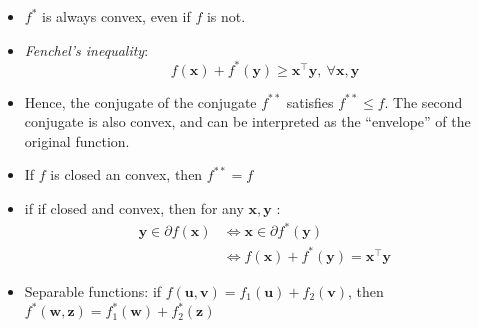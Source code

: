 \documentclass[a4paper,twoside,11pt,twocolumn]{article}
\begin{document}
\begin{itemize}
	\item $f^*$ is always convex, even if $f$ is not.
	\item \textit{Fenchel's inequality}: \[
		      f(\mathbf{x}) + f^*(\mathbf{y}) \ge \mathbf{x}^\top \mathbf{y},\ \forall \mathbf{x},\mathbf{y}
	      \]
	\item Hence, the conjugate of the conjugate $f^{**}$ satisfies $f^{**} \le f$. The second conjugate is also convex, and can be interpreted as the ``envelope'' of the original function.
	\item If $f$ is closed an convex, then $f^{**} = f$
	\item if if closed and convex, then for any $\mathbf{x},\mathbf{y}$ : \[
		      \begin{array}{ll}
			      \mathbf{y} \in \partial f(\mathbf{x}) & \Leftrightarrow \mathbf{x}\in \partial f^*(\mathbf{y})                       \\
			                                            & \Leftrightarrow f(\mathbf{x}) + f^*(\mathbf{y}) = \mathbf{x}^\top \mathbf{y}
		      \end{array}
	      \]
	\item Separable functions: if $f(\mathbf{u},\mathbf{v}) = f_1(\mathbf{u}) + f_2(\mathbf{v})$, then $f^*(\mathbf{w},\mathbf{z}) = f^*_1(\mathbf{w}) + f^*_2(\mathbf{z})$
\end{itemize}
\end{document}
